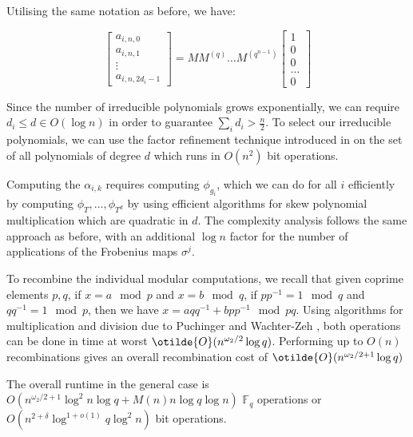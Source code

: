 \documentclass{jams-l}
\theoremstyle{remark}
\numberwithin{equation}{section}
\begin{document}
Utilising the same notation as before, we have:

\[ \begin{bmatrix} a_{i,n,0} \\ a_{i,n,1} \\ \vdots \\ a_{i,n,2d_i -1} \end{bmatrix} = MM^{(q)} \ldots M^{(q^{n-1})} \begin{bmatrix}1 \\ 0 \\ 0 \\ \ldots \\ 0 \end{bmatrix}\]

Since the number of irreducible polynomials grows exponentially, we can require $d_i \leq d \in O(\log n)$ in order to guarantee $\sum_{i} d_i > \frac{n}{2}$. To select our irreducible polynomials, we can use the factor refinement technique introduced in \cite{Bach:1993:FR:158390.158392} on the set of all polynomials of degree $d$ which runs in $O(n^2)$ bit operations.

Computing the $\alpha_{i,k}$ requires computing $\phi_{g_i}$, which we can do for all $i$ efficiently by computing $\phi_T, \ldots, \phi_{T^d}$ by using efficient algorithms for skew polynomial multiplication which are quadratic in $d$. The complexity analysis follows the same approach as before, with an additional $\log n$ factor for the number of applications of the Frobenius maps $\sigma^j$. 

To recombine the individual modular computations, we recall that given coprime elements $p,q$, if $x = a \mod p$ and $x = b \mod q$, if $pp^{-1} = 1 \mod q$ and $qq^{-1} = 1 \mod p$, then we have $x = aqq^{-1} + bpp^{-1} \mod pq$. Using algorithms for multiplication and division due to Puchinger and Wachter-Zeh \cite{PUCHINGER2017}, both operations can be done in time at worst $\otilde{O}(n^{\omega_2/2} \log q)$. Performing up to $O(n)$ recombinations gives an overall recombination cost of $\otilde{O}(n^{\omega_2/2 + 1} \log q)$

The overall runtime in the general case is $O(n^{\omega_2/2 + 1} \log^2 n \log q + M(n) n \log q \log n)$ $\mathbb{F}_q$ operations  or $O(n^{2+\delta} \log^{1 + o(1)} q \log^2 n)$ bit operations.  



\end{document}
